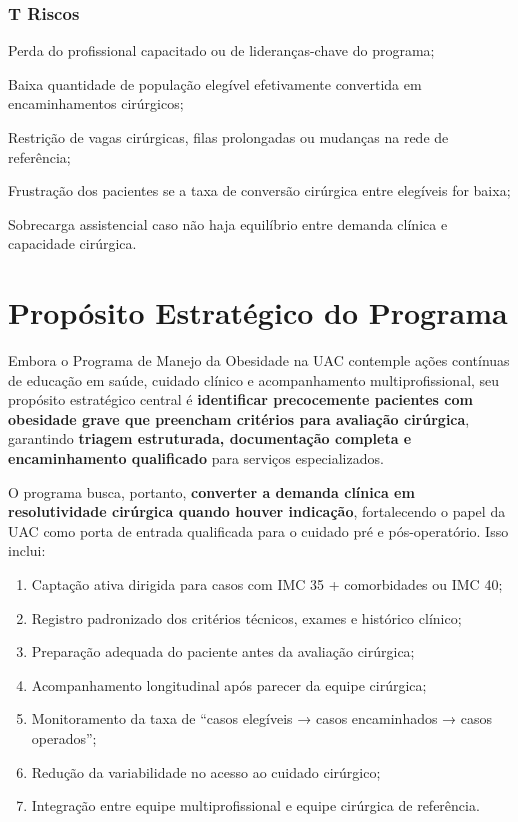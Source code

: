 \documentclass[12pt]{article}
\begin{document}
\subsubsection{T Riscos}
\label{sec:orgeed062b}
\begin{hlevelthree}
\item Perda do profissional capacitado ou de lideranças-chave do programa;
\item Baixa quantidade de população elegível efetivamente convertida em encaminhamentos cirúrgicos;
\item Restrição de vagas cirúrgicas, filas prolongadas ou mudanças na rede de referência;
\item Frustração dos pacientes se a taxa de conversão cirúrgica entre elegíveis for baixa;
\item Sobrecarga assistencial caso não haja equilíbrio entre demanda clínica e capacidade cirúrgica.
\end{hlevelthree}

\begin{center}

\label{org5d5a47f}
\end{center}

\section{Propósito Estratégico do Programa}
\label{sec:orgabb164d}
Embora o Programa de Manejo da Obesidade na UAC contemple ações contínuas de educação em saúde, cuidado clínico e acompanhamento multiprofissional, seu propósito estratégico central é \textbf{identificar precocemente pacientes com obesidade grave que preencham critérios para avaliação cirúrgica}, garantindo \textbf{triagem estruturada, documentação completa e encaminhamento qualificado} para serviços especializados.

O programa busca, portanto, \textbf{\textbf{converter a demanda clínica em resolutividade cirúrgica quando houver indicação}}, fortalecendo o papel da UAC como porta de entrada qualificada para o cuidado pré e pós-operatório. Isso inclui:
\begin{enumerate}
\item Captação ativa dirigida para casos com IMC \geqslant{} 35 + comorbidades ou IMC \geqslant{} 40;
\item Registro padronizado dos critérios técnicos, exames e histórico clínico;
\item Preparação adequada do paciente antes da avaliação cirúrgica;
\item Acompanhamento longitudinal após parecer da equipe cirúrgica;
\item Monitoramento da taxa de “casos elegíveis → casos encaminhados → casos operados”;
\item Redução da variabilidade no acesso ao cuidado cirúrgico;
\item Integração entre equipe multiprofissional e equipe cirúrgica de referência.
\end{enumerate}
\end{document}

